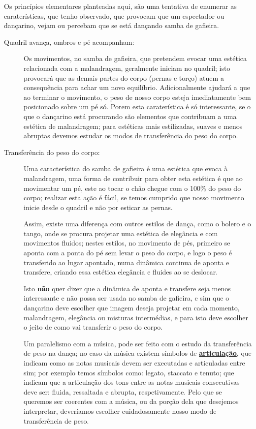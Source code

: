 Os princípios elementares planteadas aqui, são uma tentativa de enumerar as caraterísticas,
que tenho observado, que provocam que um espectador ou dançarino,
vejam ou percebam que se está dançando samba de gafieira.
\begin{description}
\item[Quadril avança, ombros e pé acompanham:]  Os movimentos, no samba de gafieira, 
que pretendem evocar uma estética relacionada com a malandragem,  geralmente iniciam no quadril;
isto provocará que as demais partes do corpo (pernas e torço) atuem a consequência para achar um novo equilíbrio.
Adicionalmente ajudará a que ao terminar o movimento, o peso de nosso corpo esteja imediatamente bem posicionado sobre um pé só.
Porem esta caraterística é só interessante, 
se o que o dançarino está procurando são elementos que contribuam a uma estética de malandragem;
para estéticas mais estilizadas, suaves e menos abruptas devemos estudar os modos de transferência do peso do corpo.

\item[Transferência do peso do corpo:] %
Uma característica do samba de gafieira é uma estética que evoca à malandragem, 
uma forma de contribuir para obter esta estética é que ao movimentar um pé, 
este ao tocar o chão chegue com o 100\% do peso do corpo; realizar esta ação é fácil, 
se temos cumprido que nosso movimento inicie desde o quadril e não por esticar as pernas.

Assim, existe uma diferença com outros estilos de dança, 
como o bolero e o tango, 
onde se procura projetar uma estética de elegância e com movimentos fluidos;
nestes estilos, no movimento de pés, primeiro se aponta com a ponta do pé sem levar o peso do corpo,
 e logo o peso é transferido ao lugar apontado, numa dinâmica continua de aponta e transfere,
criando essa estética elegância e fluides ao se deslocar.

Isto \textbf{não} quer dizer que a dinâmica de aponta e transfere seja menos interessante e não possa ser usada no samba de gafieira,
e sim que o dançarino deve escolher que imagem deseja projetar em cada momento,
malandragem, elegância ou misturas intermédias, e para isto deve escolher o jeito de como vai transferir o peso do corpo. 

Um paralelismo com a música, pode ser feito com o estudo da transferência de peso na dança;
no caso da música existem símbolos de \hyperref[sub:Articulation]{\textbf{articulação}}, 
que indicam como as notas musicais devem ser executadas e articuladas entre sim;
por exemplo temos símbolos como: legato, staccato e tenuto;
que indicam que a articulação dos tons entre as notas musicais consecutivas deve ser: fluida, ressaltada e  abrupta, respetivamente.
Pelo que se queremos ser coerentes com a música, 
ou da porção dela que desejemos interpretar,
deveríamos escolher cuidadosamente nosso modo de transferência de peso.



\end{description}

